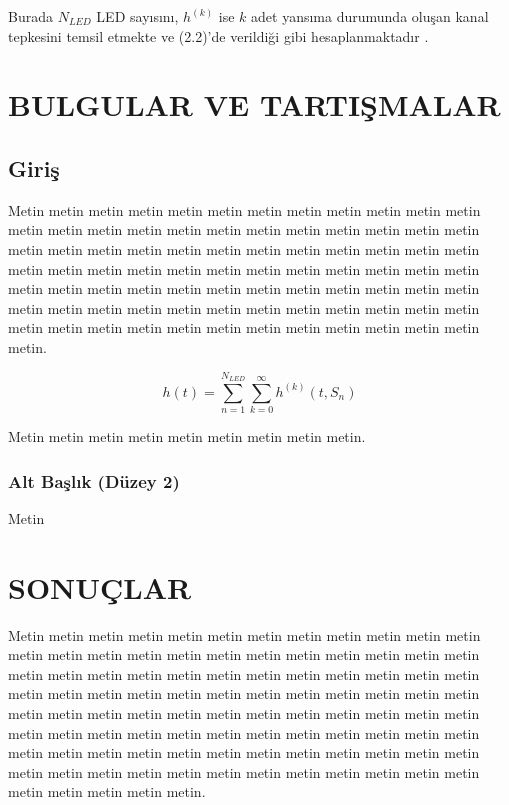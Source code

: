 \documentclass[a4paper, 12pt, oneside]{GuThesis}
\begin{document}
{Burada $N_{LED}$ LED sayısını, $h^{(k)}$ ise $k$ adet yansıma durumunda oluşan kanal tepkesini temsil etmekte ve (2.2)’de verildiği gibi hesaplanmaktadır \cite{Reference2}.

\chapter{BULGULAR VE TARTIŞMALAR}

\section{Giriş}

Metin metin metin metin metin metin metin metin metin metin metin metin metin metin metin metin metin metin metin metin metin metin metin metin metin metin metin metin metin metin metin metin metin metin metin metin metin metin metin metin metin metin metin metin metin metin metin metin metin metin metin metin metin metin metin metin metin metin metin metin metin metin metin metin metin metin metin metin metin metin metin metin metin metin metin metin metin metin metin metin metin metin metin metin metin.

\begin{equation}\label{ch_response2}
    h(t) = \sum_{n=1}^{N_{LED}}\sum_{k=0}^\infty h^{(k)}(t, S_n)
\end{equation}

Metin metin metin metin metin metin metin metin metin.

\subsection{Alt Başlık (Düzey 2)}

Metin

\chapter{SONUÇLAR}

Metin metin metin metin metin metin metin metin metin metin metin metin metin metin metin metin metin metin metin metin metin metin metin metin metin metin metin metin metin metin metin metin metin metin metin metin metin metin metin metin metin metin metin metin metin metin metin metin metin metin metin metin metin metin metin metin metin metin metin metin metin metin metin metin metin metin metin metin metin metin metin metin metin metin metin metin metin metin metin metin metin metin metin metin metin metin metin metin metin metin metin metin metin metin metin metin metin metin metin metin metin.

}
\end{document}
